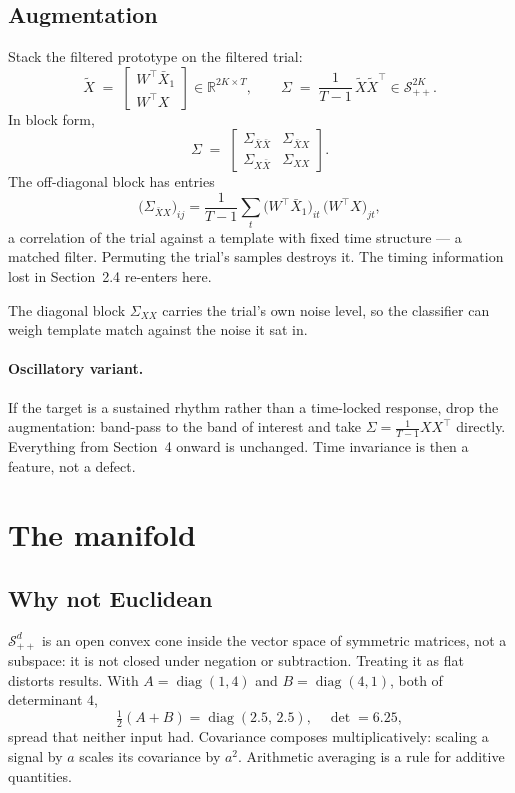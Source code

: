 \documentclass[11pt]{article}
\newcommand{\Real}{\mathbb{R}}
\newcommand{\SPD}[1]{\mathcal{S}^{#1}_{++}}
\begin{document}
\subsection{Augmentation}

Stack the filtered prototype on the filtered trial:
\[
\tilde{X} \;=\;
\begin{bmatrix} W^\top \bar{X}_1 \\[2pt] W^\top X \end{bmatrix}
\in \Real^{2K \times T},
\qquad
\Sigma \;=\; \frac{1}{T-1}\,\tilde{X}\tilde{X}^\top \in \SPD{2K}.
\]
In block form,
\[
\Sigma \;=\;
\begin{bmatrix}
\Sigma_{\bar{X}\bar{X}} & \Sigma_{\bar{X}X} \\[2pt]
\Sigma_{X\bar{X}} & \Sigma_{XX}
\end{bmatrix}.
\]
The off-diagonal block has entries
\[
\big(\Sigma_{\bar{X}X}\big)_{ij}
= \frac{1}{T-1}\sum_{t} \big(W^\top \bar{X}_1\big)_{it}\,\big(W^\top X\big)_{jt},
\]
a correlation of the trial against a template with fixed time structure
--- a matched filter. Permuting the trial's samples destroys it. The
timing information lost in Section~2.4 re-enters here.

The diagonal block $\Sigma_{XX}$ carries the trial's own noise level,
so the classifier can weigh template match against the noise it sat in.

\paragraph{Oscillatory variant.} If the target is a sustained rhythm
rather than a time-locked response, drop the augmentation: band-pass to
the band of interest and take $\Sigma = \frac{1}{T-1}XX^\top$ directly.
Everything from Section~4 onward is unchanged. Time invariance is then
a feature, not a defect.

\section{The manifold}

\subsection{Why not Euclidean}

$\SPD{d}$ is an open convex cone inside the vector space of symmetric
matrices, not a subspace: it is not closed under negation or
subtraction. Treating it as flat distorts results. With
$A=\operatorname{diag}(1,4)$ and $B=\operatorname{diag}(4,1)$, both of
determinant $4$,
\[
\tfrac{1}{2}(A+B) = \operatorname{diag}(2.5,\,2.5), \quad \det = 6.25,
\]
spread that neither input had. Covariance composes multiplicatively:
scaling a signal by $a$ scales its covariance by $a^2$. Arithmetic
averaging is a rule for additive quantities.
\end{document}
